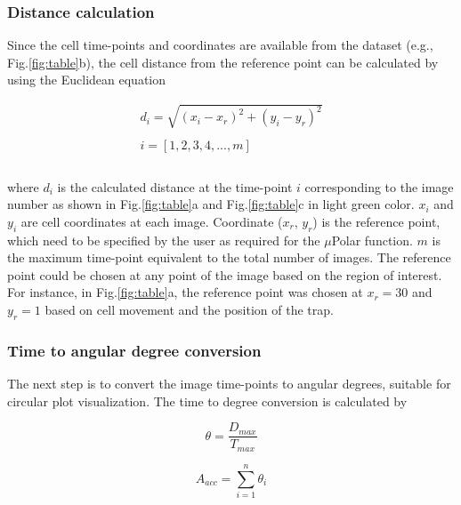 \documentclass[conference]{IEEEtran}
\begin{document}
\subsubsection{Distance calculation}
Since the cell time-points and coordinates are available from the dataset (e.g., Fig.\ref{fig:table}b), the cell distance from the reference point  can be calculated by using the Euclidean equation

\begin{equation}
\begin{split}
d_i = \sqrt{(x_i - x_r)^2 + (y_i - y_r)^2}\\
\\
i =  [1,2,3,4,..., m ] \\
\\
\end{split}
\end{equation}

\noindent where $ d_i $ is the calculated distance at the time-point $ i $ corresponding to the image number as shown in Fig.\ref{fig:table}a and Fig.\ref{fig:table}c in light green color. $ x_i $ and $ y_i $ are cell coordinates at each image. Coordinate ($ x_r $, $ y_r $) is the reference point, which need to be specified by the user as required for the $\mu$Polar function. $ m $ is the maximum time-point equivalent to the total number of images.  The reference point could be chosen at any point of the image based on the region of interest. For instance, in Fig.\ref{fig:table}a, the reference point was chosen at $x_r = 30$ and $y_r = 1$ based on cell movement and the position of the trap.
\\

\subsubsection{Time to angular degree conversion}
The next step is to convert the image time-points to angular degrees, suitable for circular plot visualization. The time to degree conversion is calculated by

\begin{equation}
\theta = \frac{D_{max}} {T_{max}}
\end{equation}

\begin{equation}
A_{acc} = \sum_{i=1}^{n}{\theta_i}
\end{equation}
\end{document}
